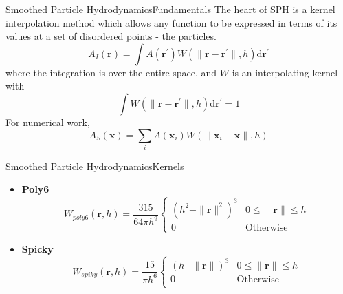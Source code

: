 \documentclass{beamer}
\begin{document}
\begin{frame}{Smoothed Particle Hydrodynamics}{Fundamentals}
The heart of SPH is a kernel interpolation method which allows any function to be expressed in terms of its values at a set of disordered points - the particles.
\pause
\begin{equation}
        A_{I}(\textbf{r}) = \int A({\textbf{r}}^{\prime})W(\|\textbf{r} - \textbf{r}^{\prime}\|, h)\mathrm{d}\textbf{r}^{\prime}
\end{equation}
\pause
where the integration is over the entire space, and $W$ is an interpolating kernel with
\pause
\begin{equation}
        \int W(\|\textbf{r} - \textbf{r}^{\prime}\|, h)\mathrm{d} \textbf{r}^{\prime} = 1
\end{equation}
For numerical work,
\pause
\begin{equation}
        A_{S}(\textbf{x}) = \sum_{i}A(\textbf{x}_{i})W(\|\textbf{x}_{i}-\textbf{x}\|, h)
\end{equation}

\end{frame}
\begin{frame}{Smoothed Particle Hydrodynamics}{Kernels}
\begin{itemize}
\item {
\textbf{Poly6}
\pause
\begin{equation}
        W_{poly 6}(\textbf{r}, h) = \frac{315}{64\pi h^{9}}
            \begin{cases}
                (h^2 - \|\textbf{r}\|^2)^3 & 0 \le \|\textbf{r}\| \le h \\
                0 & \textrm{Otherwise}
            \end{cases}
\end{equation}
\pause
}
\item {
\textbf{Spicky}
\pause
\begin{equation}
        W_{spiky}(\textbf{r}, h) = \frac{15}{\pi h^6}
            \begin{cases}
                (h - \|\textbf{r}\|)^3 & 0\le\|\textbf{r}\|\le h \\
                0 & \textrm{Otherwise}\\
            \end{cases}
\end{equation}
}
\end{itemize}
\end{frame}
\end{document}
